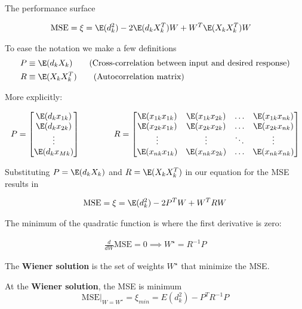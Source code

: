 \documentclass[10pt, aspectratio=169]{beamer}
\begin{document}
\begin{frame}{The performance surface}

	\begin{align*}
	\mathrm{MSE} = \xi &= \E(d^2_k) - 2\E(d_kX_k^T)W + W^T\E(X_kX_k^T)W
	\end{align*}

	To ease the notation we make a few definitions
	\begin{align*}
	P &\equiv \E(d_kX_k) \tag{Cross-correlation between input and desired response} \\
	R &\equiv \E(X_kX_k^T) \tag{Autocorrelation matrix}
	\end{align*}
	
	More explicitly:

	\begin{equation*}
		P = \begin{bmatrix}
			\E(d_kx_{1k}) \\
			\E(d_kx_{2k}) \\
			\vdots \\
			\E(d_kx_{Mk})
		\end{bmatrix} \qquad\qquad R = \begin{bmatrix}
			\E(x_{1k}x_{1k}) & \E(x_{1k}x_{2k}) & \ldots & \E(x_{1k}x_{nk}) \\
			\E(x_{2k}x_{1k}) & \E(x_{2k}x_{2k}) & \ldots & \E(x_{2k}x_{nk}) \\
				\vdots & \vdots & \ddots & \vdots \\
			\E(x_{nk}x_{1k}) & \E(x_{nk}x_{2k}) & \ldots & \E(x_{nk}x_{nk})
		\end{bmatrix} 
	\end{equation*}
\end{frame}

\begin{frame}
	Substituting $P = \E(d_kX_k)$ and $R = \E(X_kX_k^T)$ in our equation for the MSE results in 

	\begin{align*}
		\mathrm{MSE} = \xi = \E(d^2_k) - 2P^TW + W^TRW
	\end{align*}
	
	The minimum of the quadratic function is where the first derivative is zero:
	
	\begin{align}
	\frac{d}{dW}\mathrm{MSE} = 0 \implies W^\star = R^{-1}P \tag{Wiener solution}
	\end{align}
	
	The \textbf{Wiener solution} is the set of weights $W^\star$ that minimize the MSE.
	
	\vspace{0.5cm}
	At the \textbf{Wiener solution}, the MSE is minimum
	\begin{equation}
		\mathrm{MSE}|_{W =W^{\star}} = \xi_{min} = E(d^2_k) - P^TR^{-1}P \tag{Minimum MSE}
	\end{equation}
\end{frame}
\end{document}
